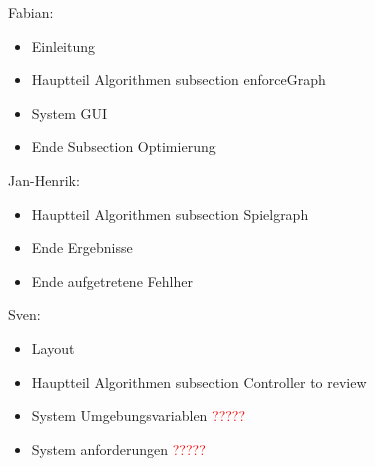 Fabian:
\begin{itemize}
	\item Einleitung
	\item Hauptteil Algorithmen subsection enforceGraph
	\item System GUI 
	\item Ende Subsection Optimierung
\end{itemize}
Jan-Henrik:
\begin{itemize}
	\item Hauptteil Algorithmen subsection Spielgraph
	\item Ende Ergebnisse
	\item Ende aufgetretene Fehlher
\end{itemize}
Sven:
\begin{itemize}
	\item Layout
	\item Hauptteil Algorithmen subsection Controller to review
	\item System Umgebungsvariablen \textcolor{red}{?????}
	\item System anforderungen \textcolor{red}{?????}
\end{itemize}
